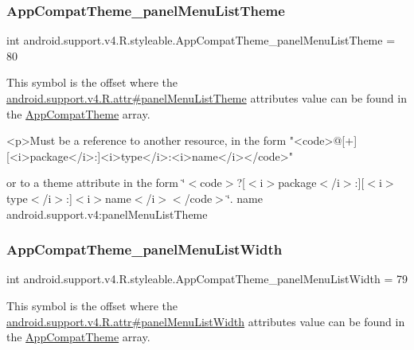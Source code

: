 \subsubsection{\texorpdfstring{App\+Compat\+Theme\+\_\+panel\+Menu\+List\+Theme}{AppCompatTheme\_panelMenuListTheme}}
{\footnotesize\ttfamily int android.\+support.\+v4.\+R.\+styleable.\+App\+Compat\+Theme\+\_\+panel\+Menu\+List\+Theme = 80\hspace{0.3cm}{\ttfamily [static]}}

This symbol is the offset where the \hyperlink{classandroid_1_1support_1_1v4_1_1R_1_1attr_a6ba4776dc756edf67526363c1d87c269}{android.\+support.\+v4.\+R.\+attr\#panel\+Menu\+List\+Theme} attribute\textquotesingle{}s value can be found in the \hyperlink{classandroid_1_1support_1_1v4_1_1R_1_1styleable_ac07ebbe62ed977f6dcaadc6397840ace}{App\+Compat\+Theme} array.

\begin{DoxyVerb}      <p>Must be a reference to another resource, in the form "<code>@[+][<i>package</i>:]<i>type</i>:<i>name</i></code>"
\end{DoxyVerb}
 or to a theme attribute in the form \char`\"{}$<$code$>$?\mbox{[}$<$i$>$package$<$/i$>$\+:\mbox{]}\mbox{[}$<$i$>$type$<$/i$>$\+:\mbox{]}$<$i$>$name$<$/i$>$$<$/code$>$\char`\"{}.  name android.\+support.\+v4\+:panel\+Menu\+List\+Theme \mbox{\label{classandroid_1_1support_1_1v4_1_1R_1_1styleable_a9241d227f19a221bfd726409aaf1ba40}} 
\subsubsection{\texorpdfstring{App\+Compat\+Theme\+\_\+panel\+Menu\+List\+Width}{AppCompatTheme\_panelMenuListWidth}}
{\footnotesize\ttfamily int android.\+support.\+v4.\+R.\+styleable.\+App\+Compat\+Theme\+\_\+panel\+Menu\+List\+Width = 79\hspace{0.3cm}{\ttfamily [static]}}

This symbol is the offset where the \hyperlink{classandroid_1_1support_1_1v4_1_1R_1_1attr_a9c5fc64ccd77f01ff944d1df2fcc080c}{android.\+support.\+v4.\+R.\+attr\#panel\+Menu\+List\+Width} attribute\textquotesingle{}s value can be found in the \hyperlink{classandroid_1_1support_1_1v4_1_1R_1_1styleable_ac07ebbe62ed977f6dcaadc6397840ace}{App\+Compat\+Theme} array.

